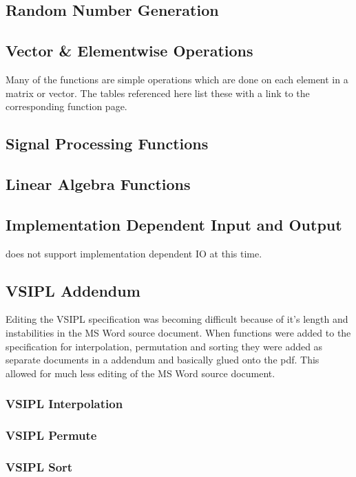 \subsection*{Random Number Generation}
\subsection*{Vector \& Elementwise Operations}
Many of the functions are simple operations which are done on each element in a matrix or vector. The tables referenced here list these with a link to the corresponding function page.
    
    
    
    
\subsection*{Signal Processing Functions}
    
\subsection*{Linear Algebra Functions}
    
\subsection*{Implementation Dependent Input and Output}
    does not support implementation dependent IO at this time.
\subsection*{VSIPL Addendum}
Editing the VSIPL specification was becoming difficult because of it's length and instabilities in the MS Word source document. When functions were added to the specification for interpolation, permutation and sorting they were added as separate documents in a addendum and basically glued onto the pdf. This allowed for much less editing of the MS Word source document.
\subsubsection*{VSIPL Interpolation}
\subsubsection*{VSIPL Permute}
\subsubsection*{VSIPL Sort}
